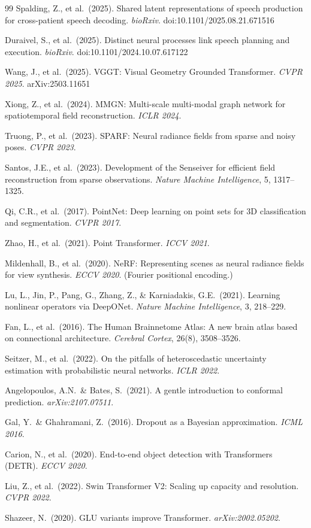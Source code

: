 \documentclass[11pt,letterpaper]{article}
\begin{document}
\begin{thebibliography}{99}
Spalding, Z., et al.\ (2025).
Shared latent representations of speech production for cross-patient speech decoding.
\textit{bioRxiv}. doi:10.1101/2025.08.21.671516

Duraivel, S., et al.\ (2025).
Distinct neural processes link speech planning and execution.
\textit{bioRxiv}. doi:10.1101/2024.10.07.617122

Wang, J., et al.\ (2025).
VGGT: Visual Geometry Grounded Transformer.
\textit{CVPR 2025}. arXiv:2503.11651

Xiong, Z., et al.\ (2024).
MMGN: Multi-scale multi-modal graph network for spatiotemporal field reconstruction.
\textit{ICLR 2024}.

Truong, P., et al.\ (2023).
SPARF: Neural radiance fields from sparse and noisy poses.
\textit{CVPR 2023}.

Santos, J.E., et al.\ (2023).
Development of the Senseiver for efficient field reconstruction from sparse observations.
\textit{Nature Machine Intelligence}, 5, 1317--1325.

Qi, C.R., et al.\ (2017).
PointNet: Deep learning on point sets for 3D classification and segmentation.
\textit{CVPR 2017}.

Zhao, H., et al.\ (2021).
Point Transformer.
\textit{ICCV 2021}.

Mildenhall, B., et al.\ (2020).
NeRF: Representing scenes as neural radiance fields for view synthesis.
\textit{ECCV 2020}. (Fourier positional encoding.)

Lu, L., Jin, P., Pang, G., Zhang, Z., \& Karniadakis, G.E.\ (2021).
Learning nonlinear operators via DeepONet.
\textit{Nature Machine Intelligence}, 3, 218--229.

Fan, L., et al.\ (2016).
The Human Brainnetome Atlas: A new brain atlas based on connectional architecture.
\textit{Cerebral Cortex}, 26(8), 3508--3526.

Seitzer, M., et al.\ (2022).
On the pitfalls of heteroscedastic uncertainty estimation with probabilistic neural networks.
\textit{ICLR 2022}.

Angelopoulos, A.N.\ \& Bates, S.\ (2021).
A gentle introduction to conformal prediction.
\textit{arXiv:2107.07511}.

Gal, Y.\ \& Ghahramani, Z.\ (2016).
Dropout as a Bayesian approximation.
\textit{ICML 2016}.

Carion, N., et al.\ (2020).
End-to-end object detection with Transformers (DETR).
\textit{ECCV 2020}.

Liu, Z., et al.\ (2022).
Swin Transformer V2: Scaling up capacity and resolution.
\textit{CVPR 2022}.

Shazeer, N.\ (2020).
GLU variants improve Transformer.
\textit{arXiv:2002.05202}.

\end{thebibliography}
\end{document}
